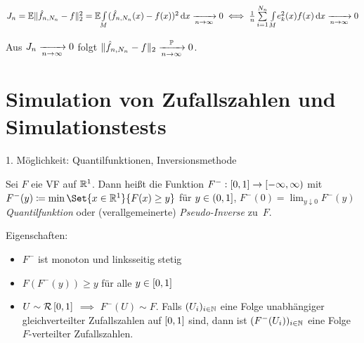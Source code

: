 \documentclass{cheat-sheet}
\renewcommand{\P}{\mathbb{P}} %
\newcommand{\E}{\mathbb{E}} %
\newcommand{\Uniform}{\mathcal{R}} %
\begin{document}

\begin{satz}
  $J_n = \E \norm{\hat{f}_{n,N_n} - f}_2^2 = \E \AInt{M}{(\hat{f}_{n,N_n}(x) - f(x))^2}{x} \xra[n \to \infty]{} 0 \iff \tfrac{1}{n} \sum_{i=1}^{N_n} \AInt{M}{e_k^2(x) f(x)}{x} \xra[n \to \infty]{} 0$
\end{satz}

\begin{kor}
  Aus $J_n \xrightarrow[n \to \infty]{} 0$ folgt $\norm{\hat{f}_{n,N_n} - f}_2 \xra[n \to \infty]{\P} 0$.
\end{kor}

\section{Simulation von Zufallszahlen und Simulationstests}


1. Möglichkeit: Quantilfunktionen, Inversionsmethode

Sei $F$ eie VF auf $\mathbb{R}^1$.
Dann heißt die Funktion $F^{-} : \left[ 0, 1 \right] \to \left[ -\infty, \infty \right)$ mit $F^{-}(y) \coloneqq \min \Set{x \in \R^1}{F(x) \geq y}$ für $y \in \left( 0, 1 \right]$, $F^{-}(0) = \lim_{y \downarrow 0} F^{-}(y)$ \emph{Quantilfunktion} oder (verallgemeinerte) \emph{Pseudo-Inverse} zu~$F$.

Eigenschaften:

\begin{itemize}
  \item $F^{-}$ ist monoton und linksseitig stetig
  \item $F(F^{-}(y)) \geq y$ für alle $y \in \left[ 0, 1 \right]$
  \item $U \sim \Uniform \cinterval{0}{1}$ $\implies$ $F^{-}(U) \sim F$.
  Falls $(U_i)_{i \in \mathbb{N}}$ eine Folge unabhängiger gleichverteilter Zufallszahlen auf $\left[ 0, 1 \right]$ sind, dann ist $(F^{-}(U_i))_{i \in \mathbb{N}}$ eine Folge $F$-verteilter Zufallszahlen.
\end{itemize}
\end{document}
